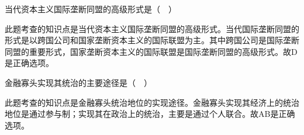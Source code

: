 \question 当代资本主义国际垄断同盟的高级形式是（　）
\par{}
\begin{solution}此题考查的知识点是当代资本主义国际垄断同盟的高级形式。当代国际垄断同盟的形式是以跨国公司和国家垄断资本主义的国际联盟为主。其中跨国公司是国际垄断同盟的重要形式，国家垄断资本主义的国际联盟是国际垄断同盟的高级形式。故D是正确选项。
\end{solution}
\question 金融寡头实现其统治的主要途径是（　）
\par{}
\begin{solution}此题考查的知识点是金融寡头统治地位的实现途径。金融寡头实现其经济上的统治地位是通过参与制；实现其在政治上的统治，主要是通过个人联合。故AB是正确选项。
\end{solution}
